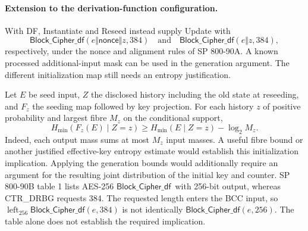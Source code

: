 \documentclass[journal=tosc,preprint,floatrow,nohyperxmp]{iacrtrans}
\newif\ifjordireview
\newcounter{jordinote}
\newcommand{\jordinote}[2]{%
  \ifjordireview
  \stepcounter{jordinote}\par\medskip\noindent
  \fcolorbox{blue!55!black}{blue!4}{%
    \begin{minipage}{\dimexpr\linewidth-2\fboxsep-2\fboxrule\relax}
    \small\raggedright\color{blue!45!black}
    \textbf{Solo Jordi -- J\thejordinote: #1}\par\smallskip
    #2
    \end{minipage}}\par\medskip
  \fi
}
\numberwithin{lemma}{section}
\numberwithin{proposition}{section}
\newcommand{\DF}{\ensuremath{\mathsf{Block\_Cipher\_df}}}
\numberwithin{equation}{section}
\theoremstyle{definition}
\numberwithin{definition}{section}
\theoremstyle{plain}
\begin{document}
\jordinote{Qué significa lo que sigue pendiente}{El ejemplo Hash\_DRBG usa hipótesis criptográficas justificadas, incluidas algunas no estándar, y no aporta una prueba cuántica separada. Por eso no debemos exigir aquí un teorema de ese tipo como nuevo requisito para estar al mismo nivel. Sí debemos distinguir las cotas clásicas demostradas de la valoración criptográfica adicional que requiere AIS 214. La revisión comparada identifica exactamente esa diferencia.}

\paragraph{Extension to the derivation-function configuration.}
With DF, Instantiate and Reseed instead supply Update with
\[
 \DF(e\Vert\mathsf{nonce}\Vert z,384)
 \quad\text{and}\quad \DF(e\Vert z,384),
\]
respectively, under the nonce and alignment rules of SP 800-90A. A known processed additional-input mask can be used in the generation argument. The different initialization map still needs an entropy justification.

Let $E$ be seed input, $Z$ the disclosed history including the old state at reseeding, and $F_z$ the seeding map followed by key projection. For each history $z$ of positive probability and largest fibre $M_z$ on the conditional support,
\begin{equation}
 H_{\min}(F_z(E)\mid Z=z)\ge H_{\min}(E\mid Z=z)-\log_2M_z.\label{eq:fibre}
\end{equation}
Indeed, each output mass sums at most $M_z$ input masses. A useful fibre bound or another justified effective-key entropy estimate would establish this initialization implication. Applying the generation bounds would additionally require an argument for the resulting joint distribution of the initial key and counter. SP 800-90B table 1 lists AES-256 \DF\ with 256-bit output, whereas CTR\_DRBG requests 384. The requested length enters the BCC input, so $\operatorname{left}_{256}\DF(e,384)$ is not identically $\DF(e,256)$. The table alone does not establish the required implication.

\jordinote{La diferencia con el argumento DF del BSI}{El estudio estima entropía mediante un modelo de aplicación aleatoria para DF. Nosotros no hemos desarrollado aquí una justificación de entropía efectiva para ese mapa y configuración. Revisa la diferencia entre pedir 256 y 384 bits a Block\_Cipher\_df y el alcance real de la tabla de la 90B. No estamos afirmando que DF falle: estamos separando la implicación que aún necesitaría justificación.}
\end{document}
